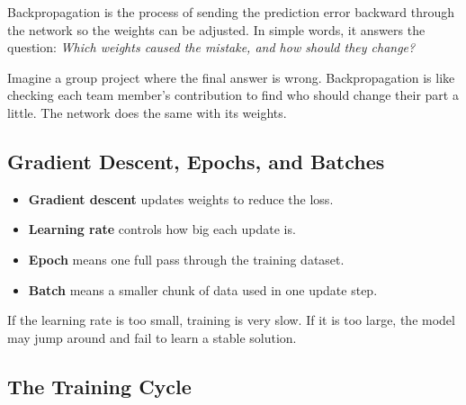 \documentclass[11pt,a4paper]{article}
\begin{document}
\begin{definitionbox}[Backpropagation]
Backpropagation is the process of sending the prediction error backward through the network so the weights can be adjusted. In simple words, it answers the question: \textit{Which weights caused the mistake, and how should they change?}
\end{definitionbox}

\begin{conceptbox}[Intuition]
Imagine a group project where the final answer is wrong. Backpropagation is like checking each team member's contribution to find who should change their part a little. The network does the same with its weights.
\end{conceptbox}

\subsection{Gradient Descent, Epochs, and Batches}

\begin{itemize}[leftmargin=*]
  \item \textbf{Gradient descent} updates weights to reduce the loss.
  \item \textbf{Learning rate} controls how big each update is.
  \item \textbf{Epoch} means one full pass through the training dataset.
  \item \textbf{Batch} means a smaller chunk of data used in one update step.
\end{itemize}

\begin{alertbox}
If the learning rate is too small, training is very slow. If it is too large, the model may jump around and fail to learn a stable solution.
\end{alertbox}

\subsection{The Training Cycle}
\end{document}
